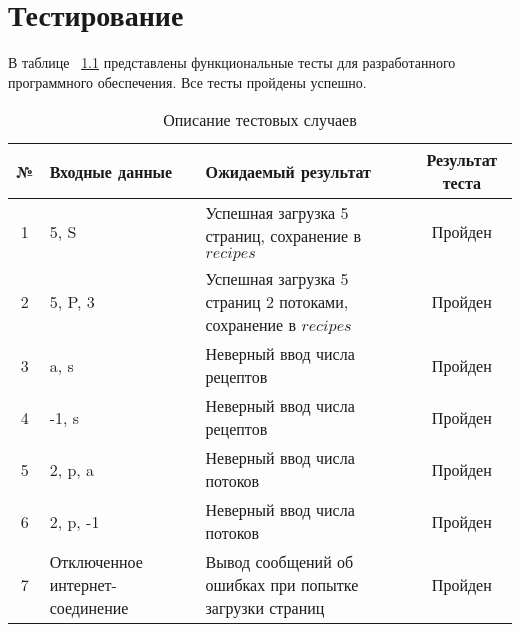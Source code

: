 \chapter{Тестирование}

В таблице ~\ref{tbl:tests} представлены функциональные тесты для разработанного
программного обеспечения. Все тесты пройдены успешно.

\begin{table}[h!]
    \begin{center}
		\begin{threeparttable}
    \caption{Описание тестовых случаев}
    \captionsetup{justification=raggedright, singlelinecheck=false}
    \label{tbl:tests}
    \begin{tabular}{|c|p{5cm}|p{7cm}|c|}
        \hline
        \textbf{№} & \textbf{Входные данные} & \textbf{Ожидаемый результат} & \textbf{Результат теста} \\
        \hline
        1 & 5, S & Успешная загрузка 5 страниц, сохранение в $recipes$ & Пройден \\
        \hline
        2 & 5, P, 3 & Успешная загрузка 5 страниц 2 потоками, сохранение в $recipes$ & Пройден \\
        \hline
        3 & a, s & Неверный ввод числа рецептов & Пройден \\
        \hline
        4 & -1, s & Неверный ввод числа рецептов & Пройден \\
        \hline
        5 & 2, p, a & Неверный ввод числа потоков & Пройден \\
        \hline
        6 & 2, p, -1 & Неверный ввод числа потоков & Пройден \\
        \hline
        7 & Отключенное интернет-соединение & Вывод сообщений об ошибках при попытке загрузки страниц & Пройден \\
        \hline
    \end{tabular}
    \end{threeparttable}
    \end{center}
\end{table}

\clearpage
